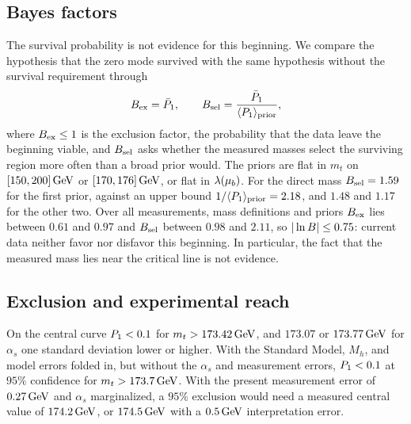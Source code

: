 \subsection{Bayes factors}
\label{sec:rb-bayes}

The survival probability is not evidence for this beginning.
We compare the hypothesis that the zero mode survived with the same hypothesis without the survival requirement through
\begin{equation}
B_{\rm ex}=\bar P_1,\qquad B_{\rm sel}=\frac{\bar P_1}{\langle P_1\rangle_{\rm prior}},
\label{eq:rb-bayes}
\end{equation}
where $B_{\rm ex}\le1$ is the exclusion factor, the probability that the data leave the beginning viable, and $B_{\rm sel}$ asks whether the measured masses select the surviving region more often than a broad prior would.
The priors are flat in $m_t$ on $[150,200]\,\mathrm{GeV}$ or $[170,176]\,\mathrm{GeV}$, or flat in $\lambda(\mu_b)$. %
For the direct mass $B_{\rm sel}=1.59$ for the first prior, against an upper bound $1/\langle P_1\rangle_{\rm prior}=2.18$, and $1.48$ and $1.17$ for the other two. %
Over all measurements, mass definitions and priors $B_{\rm ex}$ lies between $0.61$ and $0.97$ and $B_{\rm sel}$ between $0.98$ and $2.11$, so $|\ln B|\le0.75$: current data neither favor nor disfavor this beginning. %
In particular, the fact that the measured mass lies near the critical line is not evidence.

\subsection{Exclusion and experimental reach}
\label{sec:rb-reach}

On the central curve $P_1<0.1$ for $m_t>173.42\,\mathrm{GeV}$, and $173.07$ or $173.77\,\mathrm{GeV}$ for $\alpha_s$ one standard deviation lower or higher. %
With the Standard Model, $M_h$, and model errors folded in, but without the $\alpha_s$ and measurement errors, $P_1<0.1$ at $95\%$ confidence for $m_t>173.7\,\mathrm{GeV}$. %
With the present measurement error of $0.27\,\mathrm{GeV}$ and $\alpha_s$ marginalized, a $95\%$ exclusion would need a measured central value of $174.2\,\mathrm{GeV}$, or $174.5\,\mathrm{GeV}$ with a $0.5\,\mathrm{GeV}$ interpretation error. %

